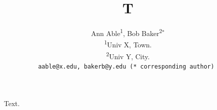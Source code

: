\documentclass{article}
\title{T}
\author{Ann Able\textsuperscript{1}, Bob Baker\textsuperscript{2}$^*$\\
\textsuperscript{1}Univ X, Town. \\
\textsuperscript{2}Univ Y, City. \\
\tt\small aable@x.edu, bakerb@y.edu (* corresponding author)
}
\date{}
\begin{document}
\maketitle
Text.
\end{document}
